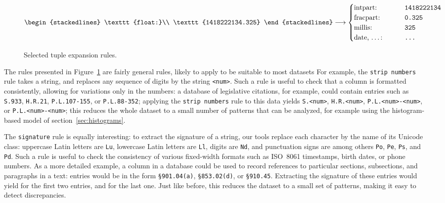 \begin{figure}[H]
   $\begin{stackedlines}
    \texttt{float:}\\
    \texttt{1418222134.325}
  \end{stackedlines} \longrightarrow
  \begin{cases}
    \text{intpart:} & \texttt{1418222134}\\
    \text{fracpart:} & \texttt{0.325}\\
    \text{millis:} & \texttt{325}\\
    \text{\parbox{\widthof{\largest}}{date, \ldots:}} & \texttt{\ldots}
  \end{cases}\hfill$

  \caption{Selected tuple expansion rules.}
  \label{fig:tuple-expansion}
\end{figure}

The rules presented in Figure~\ref{fig:tuple-expansion} are fairly general rules, likely to apply to be suitable to most datasets For example, the \texttt{strip numbers} rule takes a string, and replaces any sequence of digits by the string \texttt{<num>}. Such a rule is useful to check that a column is formatted consistently, allowing for variations only in the numbers: a database of legislative citations, for example, could contain entries such as \texttt{S.933}, \texttt{H.R.21}, \texttt{P.L.107-155}, or \texttt{P.L.88-352}; applying the \texttt{strip numbers} rule to this data yields \texttt{S.<num>}, \texttt{H.R.<num>}, \texttt{P.L.<num>-<num>}, or \texttt{P.L.<num>-<num>}; this reduces the whole dataset to a small number of patterns that can be analyzed, for example using the histogram-based model of section~\ref{sec:histograms}.

The \texttt{signature} rule is equally interesting: to extract the signature of a string, our tools replace each character by the name of its Unicode class: uppercase Latin letters are \texttt{Lu}, lowercase Latin letters are \texttt{Ll}, digits are \texttt{Nd}, and punctuation signs are among others \texttt{Po}, \texttt{Pe}, \texttt{Ps}, and \texttt{Pd}. Such a rule is useful to check the consistency of various fixed-width formats such as ISO~8061 timestamps, birth dates, or phone numbers. As a more detailed example, a column in a database could be used to record references to particular sections, subsections, and paragraphs in a text: entries would be in the form \texttt{\S901.04(a)}, \texttt{\S853.02(d)}, or \texttt{\S910.45}. Extracting the signature of these entries would yield  for the first two entries, and  for the last one. Just like before, this reduces the dataset to a small set of patterns, making it easy to detect discrepancies. %
